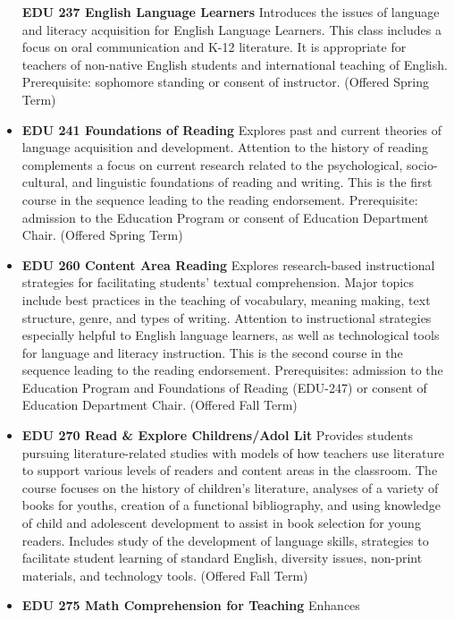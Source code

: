 \documentclass[
  letterpaper,
]{scrbook}
\begin{document}
\begin{itemize}
  \textbf{EDU 237 English Language Learners} Introduces the issues of
  language and literacy acquisition for English Language Learners. This
  class includes a focus on oral communication and K-12 literature. It
  is appropriate for teachers of non-native English students and
  international teaching of English. Prerequisite: sophomore standing or
  consent of instructor. (Offered Spring Term)\\
\item
  \textbf{EDU 241 Foundations of Reading} Explores past and current
  theories of language acquisition and development. Attention to the
  history of reading complements a focus on current research related to
  the psychological, socio-cultural, and linguistic foundations of
  reading and writing. This is the first course in the sequence leading
  to the reading endorsement. Prerequisite: admission to the Education
  Program or consent of Education Department Chair. (Offered Spring
  Term)\\
\item
  \textbf{EDU 260 Content Area Reading} Explores research-based
  instructional strategies for facilitating students' textual
  comprehension. Major topics include best practices in the teaching of
  vocabulary, meaning making, text structure, genre, and types of
  writing. Attention to instructional strategies especially helpful to
  English language learners, as well as technological tools for language
  and literacy instruction. This is the second course in the sequence
  leading to the reading endorsement. Prerequisites: admission to the
  Education Program and Foundations of Reading (EDU-247) or consent of
  Education Department Chair. (Offered Fall Term)\\
\item
  \textbf{EDU 270 Read \& Explore Childrens/Adol Lit} Provides students
  pursuing literature-related studies with models of how teachers use
  literature to support various levels of readers and content areas in
  the classroom. The course focuses on the history of children's
  literature, analyses of a variety of books for youths, creation of a
  functional bibliography, and using knowledge of child and adolescent
  development to assist in book selection for young readers. Includes
  study of the development of language skills, strategies to facilitate
  student learning of standard English, diversity issues, non-print
  materials, and technology tools. (Offered Fall Term)\\
\item
  \textbf{EDU 275 Math Comprehension for Teaching} Enhances

\end{itemize}
\end{document}
